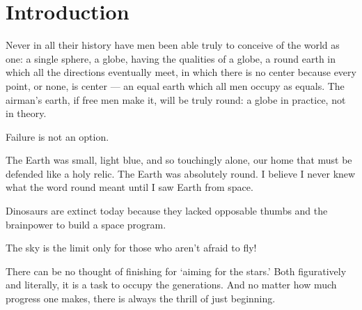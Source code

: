 
\chapter{Introduction}

Never in all their history have men been able truly to conceive of the world as one: a single sphere, a globe, having the qualities of a globe, a round earth in which all the directions eventually meet, in which there is no center because every point, or none, is center — an equal earth which all men occupy as equals. The airman's earth, if free men make it, will be truly round: a globe in practice, not in theory.

Failure is not an option.

The Earth was small, light blue, and so touchingly alone, our home that must be defended like a holy relic. The Earth was absolutely round. I believe I never knew what the word round meant until I saw Earth from space.

Dinosaurs are extinct today because they lacked opposable thumbs and the brainpower to build a space program.

The sky is the limit only for those who aren't afraid to fly!

There can be no thought of finishing for ‘aiming for the stars.’ Both figuratively and literally, it is a task to occupy the generations. And no matter how much progress one makes, there is always the thrill of just beginning.